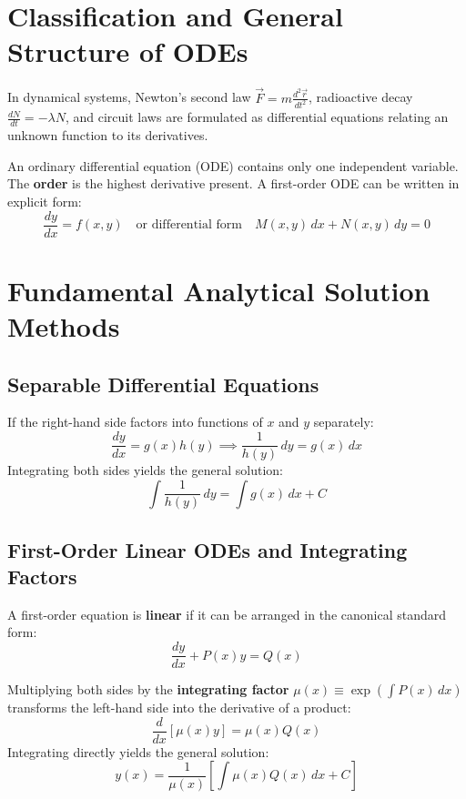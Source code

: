 \section{Classification and General Structure of ODEs}
In dynamical systems, Newton's second law $\vec{F} = m\frac{d^2\vec{r}}{dt^2}$, radioactive decay $\frac{dN}{dt} = -\lambda N$, and circuit laws are formulated as differential equations relating an unknown function to its derivatives.

An ordinary differential equation (ODE) contains only one independent variable. The \textbf{order} is the highest derivative present. A first-order ODE can be written in explicit form:
\begin{equation}
\frac{dy}{dx} = f(x, y) \quad \text{or differential form} \quad M(x, y)\,dx + N(x, y)\,dy = 0
\end{equation}

\section{Fundamental Analytical Solution Methods}

\subsection{Separable Differential Equations}
If the right-hand side factors into functions of $x$ and $y$ separately:
\begin{equation}
\frac{dy}{dx} = g(x)h(y) \implies \frac{1}{h(y)}\,dy = g(x)\,dx
\end{equation}
Integrating both sides yields the general solution:
\begin{equation}
\int \frac{1}{h(y)}\,dy = \int g(x)\,dx + C
\end{equation}

\subsection{First-Order Linear ODEs and Integrating Factors}
A first-order equation is \textbf{linear} if it can be arranged in the canonical standard form:
\begin{equation}
\frac{dy}{dx} + P(x)y = Q(x)
\end{equation}

\begin{maththeorem}
Multiplying both sides by the \textbf{integrating factor} $\mu(x) \equiv \exp\left(\int P(x)\,dx\right)$ transforms the left-hand side into the derivative of a product:
\begin{equation}
\frac{d}{dx}\left[\mu(x)y\right] = \mu(x)Q(x)
\end{equation}
Integrating directly yields the general solution:
\begin{equation}
y(x) = \frac{1}{\mu(x)}\left[\int \mu(x)Q(x)\,dx + C\right]
\end{equation}
\end{maththeorem}

